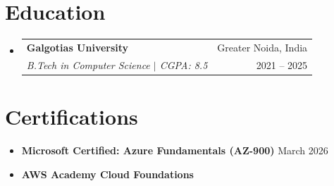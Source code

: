 \documentclass[11pt, a4paper]{article}
\makeatletter
\newcommand{\resumeItem}[1]{
  \item\small{#1}
}
\newcommand{\resumeSubheading}[4]{
  \vspace{-2pt}\item[]
    \begin{tabular*}{1\textwidth}[t]{l@{\extracolsep{\fill}}r}
      \textbf{#1} & \textcolor{muted}{\small #2} \\
      \textit{#3} & \textcolor{muted}{\small #4} \\
    \end{tabular*}\vspace{-6pt}
}
\makeatother
\begin{document}
\section{Education}
\vspace{2pt}
\begin{itemize}[leftmargin=0in, label={}]
  \resumeSubheading
      {Galgotias University}{Greater Noida, India}
      {B.Tech in Computer Science $|$ CGPA: 8.5}{2021 -- 2025}
\end{itemize}
\vspace{-4pt}

\section{Certifications}
\vspace{2pt}
\begin{itemize}[leftmargin=0.15in, itemsep=1pt, parsep=0pt]
    \resumeItem{\textbf{Microsoft Certified: Azure Fundamentals (AZ-900)} \hfill \textcolor{muted}{March 2026}}
    \resumeItem{\textbf{AWS Academy Cloud Foundations}}
\end{itemize}
\end{document}
